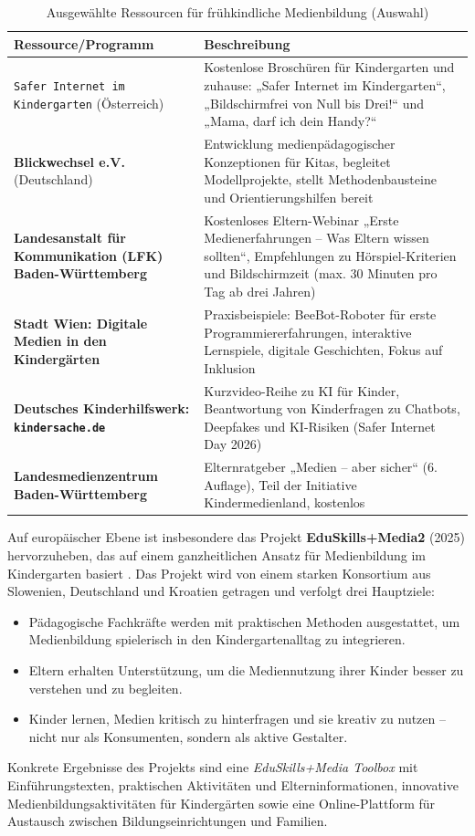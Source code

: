 \documentclass[11pt,a4paper]{article}
\begin{document}
	\begin{table}[ht]
		\centering
		\caption{Ausgewählte Ressourcen für frühkindliche Medienbildung (Auswahl)}
		\begin{tabularx}{\linewidth}{@{}p{3.5cm}X@{}}
			\toprule
			\textbf{Ressource/Programm} & \textbf{Beschreibung} \\
			\midrule
			\texttt{Safer Internet im Kindergarten} (Österreich) & Kostenlose Broschüren für Kindergarten und zuhause: „Safer Internet im Kindergarten“, „Bildschirmfrei von Null bis Drei!“ und „Mama, darf ich dein Handy?“ \cite{saferkindergarten} \\
			\textbf{Blickwechsel e.V.} (Deutschland) & Entwicklung medienpädagogischer Konzeptionen für Kitas, begleitet Modellprojekte, stellt Methodenbausteine und Orientierungshilfen bereit \cite{blickwechsel} \\
			\textbf{Landesanstalt für Kommunikation (LFK) Baden-Württemberg} & Kostenloses Eltern-Webinar „Erste Medienerfahrungen – Was Eltern wissen sollten“, Empfehlungen zu Hörspiel-Kriterien und Bildschirmzeit (max. 30 Minuten pro Tag ab drei Jahren) \cite{lfk} \\
			\textbf{Stadt Wien: Digitale Medien in den Kindergärten} & Praxisbeispiele: BeeBot-Roboter für erste Programmiererfahrungen, interaktive Lernspiele, digitale Geschichten, Fokus auf Inklusion \cite{wienmedien} \\
			\textbf{Deutsches Kinderhilfswerk: \texttt{kindersache.de}} & Kurzvideo-Reihe zu KI für Kinder, Beantwortung von Kinderfragen zu Chatbots, Deepfakes und KI-Risiken (Safer Internet Day 2026) \cite{dkhw2026} \\
			\textbf{Landesmedienzentrum Baden-Württemberg} & Elternratgeber „Medien – aber sicher“ (6. Auflage), Teil der Initiative Kindermedienland, kostenlos \cite{lmz} \\
			\bottomrule
		\end{tabularx}
	\end{table}
	
	Auf europäischer Ebene ist insbesondere das Projekt \textbf{EduSkills+Media2} (2025) hervorzuheben, das auf einem ganzheitlichen Ansatz für Medienbildung im Kindergarten basiert \cite{eduskills}. Das Projekt wird von einem starken Konsortium aus Slowenien, Deutschland und Kroatien getragen und verfolgt drei Hauptziele:
	\begin{itemize}
		\item Pädagogische Fachkräfte werden mit praktischen Methoden ausgestattet, um Medienbildung spielerisch in den Kindergartenalltag zu integrieren.
		\item Eltern erhalten Unterstützung, um die Mediennutzung ihrer Kinder besser zu verstehen und zu begleiten.
		\item Kinder lernen, Medien kritisch zu hinterfragen und sie kreativ zu nutzen – nicht nur als Konsumenten, sondern als aktive Gestalter.
	\end{itemize}
	Konkrete Ergebnisse des Projekts sind eine \textit{EduSkills+Media Toolbox} mit Einführungstexten, praktischen Aktivitäten und Elterninformationen, innovative Medienbildungsaktivitäten für Kindergärten sowie eine Online-Plattform für Austausch zwischen Bildungseinrichtungen und Familien.
	
\end{document}
